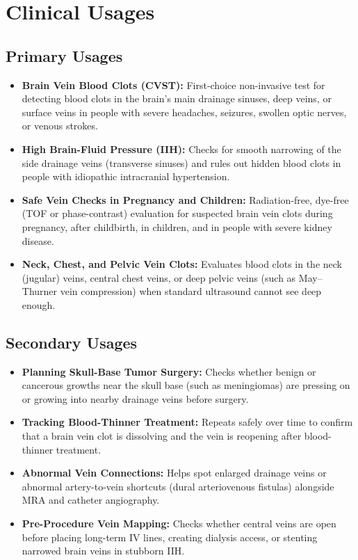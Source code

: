 \section{Clinical Usages}

\subsection{Primary Usages}
\begin{itemize}
\item \textbf{Brain Vein Blood Clots (CVST):} First-choice non-invasive test for detecting blood clots in the brain's main drainage sinuses, deep veins, or surface veins in people with severe headaches, seizures, swollen optic nerves, or venous strokes.
\item \textbf{High Brain-Fluid Pressure (IIH):} Checks for smooth narrowing of the side drainage veins (transverse sinuses) and rules out hidden blood clots in people with idiopathic intracranial hypertension.
\item \textbf{Safe Vein Checks in Pregnancy and Children:} Radiation-free, dye-free (TOF or phase-contrast) evaluation for suspected brain vein clots during pregnancy, after childbirth, in children, and in people with severe kidney disease.
\item \textbf{Neck, Chest, and Pelvic Vein Clots:} Evaluates blood clots in the neck (jugular) veins, central chest veins, or deep pelvic veins (such as May--Thurner vein compression) when standard ultrasound cannot see deep enough.
\end{itemize}

\subsection{Secondary Usages}
\begin{itemize}
\item \textbf{Planning Skull-Base Tumor Surgery:} Checks whether benign or cancerous growths near the skull base (such as meningiomas) are pressing on or growing into nearby drainage veins before surgery.
\item \textbf{Tracking Blood-Thinner Treatment:} Repeats safely over time to confirm that a brain vein clot is dissolving and the vein is reopening after blood-thinner treatment.
\item \textbf{Abnormal Vein Connections:} Helps spot enlarged drainage veins or abnormal artery-to-vein shortcuts (dural arteriovenous fistulas) alongside MRA and catheter angiography.
\item \textbf{Pre-Procedure Vein Mapping:} Checks whether central veins are open before placing long-term IV lines, creating dialysis access, or stenting narrowed brain veins in stubborn IIH.
\end{itemize}

